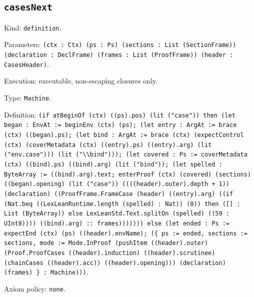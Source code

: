 \documentclass[11pt]{article}
\begin{document}
\subsection*{\texttt{casesNext}}
\noindent Kind: \texttt{definition}.\par
\noindent Parameters: \texttt{(ctx : Ctx) (ps : Ps) (sections : List (SectionFrame)) (declaration : DeclFrame) (frames : List (ProofFrame)) (header : CasesHeader)}.\par
\noindent Execution: executable, non-escaping closures only.\par
\noindent Type: \texttt{Machine}.\par
\noindent Definition: \texttt{(if atBeginOf (ctx) ((ps).pos) (lit ("case")) then (let began : EnvAt := beginEnv (ctx) (ps); (let entry : ArgAt := brace (ctx) ((began).ps); (let bind : ArgAt := brace (ctx) (expectControl (ctx) (coverMetadata (ctx) ((entry).ps) ((entry).arg) (lit ("env.case"))) (lit ("\textbackslash{}\textbackslash{}bind"))); (let covered : Ps := coverMetadata (ctx) ((bind).ps) ((bind).arg) (lit ("bind")); (let spelled : ByteArray := ((bind).arg).text; enterProof (ctx) (covered) (sections) ((began).opening) (lit ("case")) ((((header).outer).depth + 1)) (declaration) ((ProofFrame.FrameCase (header) ((entry).arg) ((if (Nat.beq ((LexLeanRuntime.length (spelled) : Nat)) (0)) then ([] : List (ByteArray)) else LexLeanStd.Text.splitOn (spelled) ((59 : UInt8)))) ((bind).arg) :: frames))))))) else (let ended : Ps := expectEnd (ctx) (ps) ((header).envName); (\{ ps := ended, sections := sections, mode := Mode.InProof (pushItem ((header).outer) (Proof.ProofCases ((header).induction) ((header).scrutinee) (chainCases ((header).acc)) ((header).opening))) (declaration) (frames) \} : Machine)))}.\par
\noindent Axiom policy: \texttt{none}.\par
\end{document}
